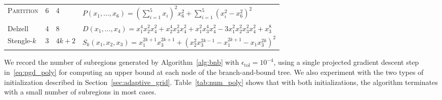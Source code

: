 \documentclass[12pt]{article}
\theoremstyle{remark}
\begin{document}
\begin{table}
\begin{tabular}{llll}
\textsc{Partition} & 6 & 4& $P(x_1,\ldots,x_6)=\left(\sum_{i=1}^5x_i\right)^2x_6^2+\sum_{i=1}^5(x_i^2-x_6^2)^2$\\
  Delzell & 4 & 8 & $D(x_1,\ldots,x_4)=x_1^4x_2^2x_4^2+x_2^4x_3^2x_4^2+x_1^2x_3^4x_4^2-3x_1^2x_2^2x_3^2x_4^2+x_3^{8}$\\
  Stengle-$k$ & 3 &$4k+2$  & $S_k(x_1,x_2,x_3)=x_1^{2k+1}x_3^{2k+1}+(x_2^2x_3^{2k-1}-x_1^{2k+1}-x_1x_3^{2k})^2$\\
  \bottomrule
  \end{tabular}
\end{table}

We record the number of subregions generated by Algorithm~\ref{alg:bnb} with $\epsilon_{\text{tol}}=10^{-4}$, using a single projected gradient descent step in~\eqref{eq:pgd_poly} for computing an upper bound at each node of the branch-and-bound tree. We also experiment with the two types of initialization described in Section~\ref{sec:adaptive_grid}. Table~\ref{tab:num_poly} shows that with both initializations, the algorithm terminates with a small number of subregions in most cases. 

\end{document}
